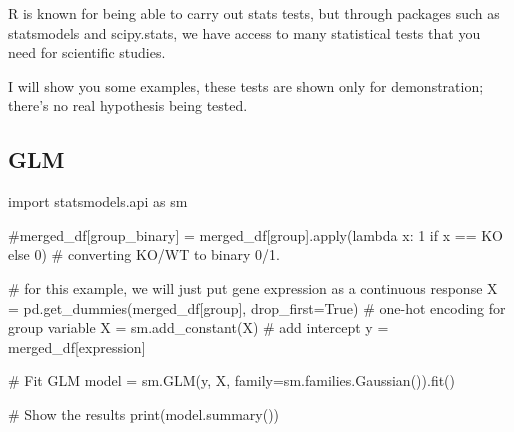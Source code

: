 \documentclass[
  letterpaper,
  DIV=11,
  numbers=noendperiod]{scrartcl}
\newenvironment{Shaded}{\begin{snugshade}}{\end{snugshade}}
\newcommand{\BuiltInTok}[1]{\textcolor[rgb]{0.00,0.23,0.31}{#1}}
\newcommand{\CommentTok}[1]{\textcolor[rgb]{0.37,0.37,0.37}{#1}}
\newcommand{\ImportTok}[1]{\textcolor[rgb]{0.00,0.46,0.62}{#1}}
\newcommand{\NormalTok}[1]{\textcolor[rgb]{0.00,0.23,0.31}{#1}}
\newcommand{\OperatorTok}[1]{\textcolor[rgb]{0.37,0.37,0.37}{#1}}
\newcommand{\StringTok}[1]{\textcolor[rgb]{0.13,0.47,0.30}{#1}}
\newcommand{\VariableTok}[1]{\textcolor[rgb]{0.07,0.07,0.07}{#1}}
\begin{document}
R is known for being able to carry out stats tests, but through packages
such as statsmodels and scipy.stats, we have access to many statistical
tests that you need for scientific studies.

I will show you some examples, these tests are shown only for
demonstration; there's no real hypothesis being tested.

\subsection{GLM}\label{glm}

\begin{Shaded}
\begin{Highlighting}[]
\ImportTok{import}\NormalTok{ statsmodels.api }\ImportTok{as}\NormalTok{ sm}


\CommentTok{\#merged\_df[\textquotesingle{}group\_binary\textquotesingle{}] = merged\_df[\textquotesingle{}group\textquotesingle{}].apply(lambda x: 1 if x == \textquotesingle{}KO\textquotesingle{} else 0) \# converting KO/WT to binary 0/1.}

\CommentTok{\# for this example, we will just put gene expression as a continuous response}
\NormalTok{X }\OperatorTok{=}\NormalTok{ pd.get\_dummies(merged\_df[}\StringTok{\textquotesingle{}group\textquotesingle{}}\NormalTok{], drop\_first}\OperatorTok{=}\VariableTok{True}\NormalTok{)  }\CommentTok{\# one{-}hot encoding for group variable}
\NormalTok{X }\OperatorTok{=}\NormalTok{ sm.add\_constant(X)  }\CommentTok{\# add intercept}
\NormalTok{y }\OperatorTok{=}\NormalTok{ merged\_df[}\StringTok{\textquotesingle{}expression\textquotesingle{}}\NormalTok{]}

\CommentTok{\# Fit GLM}
\NormalTok{model }\OperatorTok{=}\NormalTok{ sm.GLM(y, X, family}\OperatorTok{=}\NormalTok{sm.families.Gaussian()).fit()}

\CommentTok{\# Show the results}
\BuiltInTok{print}\NormalTok{(model.summary())}
\end{Highlighting}
\end{Shaded}
\end{document}
